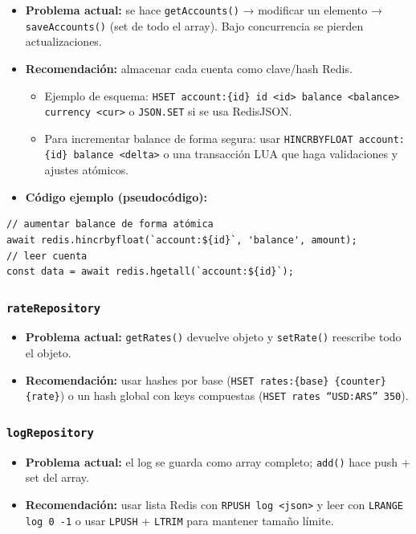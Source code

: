 \begin{itemize}[leftmargin=*]
    \item \textbf{Problema actual:} se hace \texttt{getAccounts()} → modificar un elemento → \texttt{saveAccounts()} (set de todo el array). Bajo concurrencia se pierden actualizaciones.
    \item \textbf{Recomendación:} almacenar cada cuenta como clave/hash Redis.
    \begin{itemize}
        \item Ejemplo de esquema: \texttt{HSET account:\{id\} id <id> balance <balance> currency <cur>} o \texttt{JSON.SET} si se usa RedisJSON.
        \item Para incrementar balance de forma segura: usar \texttt{HINCRBYFLOAT account:\{id\} balance <delta>} o una transacción LUA que haga validaciones y ajustes atómicos.
    \end{itemize}
    \item \textbf{Código ejemplo (pseudocódigo):}
\end{itemize}

\begin{verbatim}
// aumentar balance de forma atómica
await redis.hincrbyfloat(`account:${id}`, 'balance', amount);
// leer cuenta
const data = await redis.hgetall(`account:${id}`);
\end{verbatim}

\subsubsection{\texttt{rateRepository}}

\begin{itemize}[leftmargin=*]
    \item \textbf{Problema actual:} \texttt{getRates()} devuelve objeto y \texttt{setRate()} reescribe todo el objeto.
    \item \textbf{Recomendación:} usar hashes por base (\texttt{HSET rates:\{base\} \{counter\} \{rate\}}) o un hash global con keys compuestas (\texttt{HSET rates ``USD:ARS'' 350}).
\end{itemize}

\subsubsection{\texttt{logRepository}}

\begin{itemize}[leftmargin=*]
    \item \textbf{Problema actual:} el log se guarda como array completo; \texttt{add()} hace push + set del array.
    \item \textbf{Recomendación:} usar lista Redis con \texttt{RPUSH log <json>} y leer con \texttt{LRANGE log 0 -1} o usar \texttt{LPUSH} + \texttt{LTRIM} para mantener tamaño límite.
\end{itemize}

